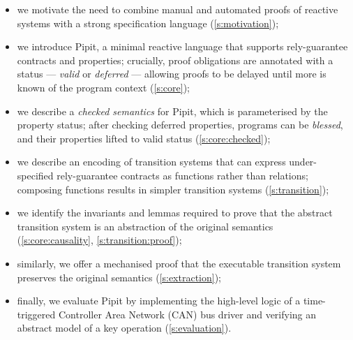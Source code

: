 \begin{itemize}
  \item we motivate the need to combine manual and automated proofs of reactive systems with a strong specification language (\autoref{s:motivation});
  \item we introduce Pipit, a minimal reactive language that supports rely-guarantee contracts and properties; crucially, proof obligations are annotated with a status --- \emph{valid} or \emph{deferred} --- allowing proofs to be delayed until more is known of the program context (\autoref{s:core});
  \item we describe a \emph{checked semantics} for Pipit, which is parameterised by the property status; after checking deferred properties, programs can be \emph{blessed}, and their properties lifted to valid status (\autoref{s:core:checked});
  \item we describe an encoding of transition systems that can express under-specified rely-guarantee contracts as functions rather than relations; composing functions results in simpler transition systems (\autoref{s:transition});
  \item we identify the invariants and lemmas required to prove that the abstract transition system is an abstraction of the original semantics (\autoref{s:core:causality}, \autoref{s:transition:proof});
  \item similarly, we offer a mechanised proof that the executable transition system preserves the original semantics (\autoref{s:extraction});
  \item finally, we evaluate Pipit by implementing the high-level logic of a time-triggered Controller Area Network (CAN) bus driver and verifying an abstract model of a key operation (\autoref{s:evaluation}).
\end{itemize}
